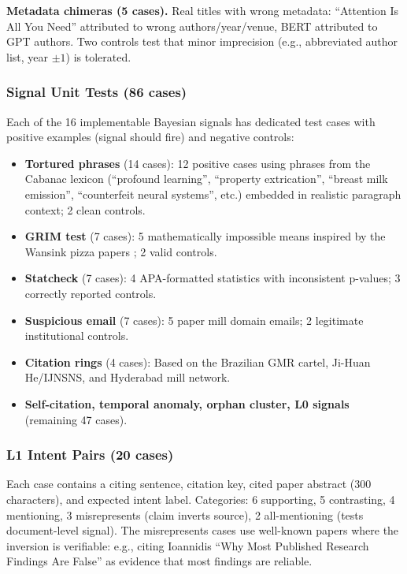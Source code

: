\documentclass[sigconf,nonacm]{acmart}
\begin{document}
\textbf{Metadata chimeras (5 cases).}
Real titles with wrong metadata: ``Attention Is All You Need'' attributed to wrong authors/year/venue, BERT attributed to GPT authors.
Two controls test that minor imprecision (e.g., abbreviated author list, year $\pm 1$) is tolerated.

\subsubsection{Signal Unit Tests (86 cases)}

Each of the 16 implementable Bayesian signals has dedicated test cases with positive examples (signal should fire) and negative controls:

\begin{itemize}[leftmargin=*]
    \item \textbf{Tortured phrases} (14 cases): 12 positive cases using phrases from the Cabanac lexicon (``profound learning'', ``property extrication'', ``breast milk emission'', ``counterfeit neural systems'', etc.) embedded in realistic paragraph context; 2 clean controls.

    \item \textbf{GRIM test} (7 cases): 5 mathematically impossible means inspired by the Wansink pizza papers \cite{vanderzee2017}; 2 valid controls.

    \item \textbf{Statcheck} (7 cases): 4 APA-formatted statistics with inconsistent p-values; 3 correctly reported controls.

    \item \textbf{Suspicious email} (7 cases): 5 paper mill domain emails; 2 legitimate institutional controls.

    \item \textbf{Citation rings} (4 cases): Based on the Brazilian GMR cartel, Ji-Huan He/IJNSNS, and Hyderabad mill network.

    \item \textbf{Self-citation, temporal anomaly, orphan cluster, L0 signals} (remaining 47 cases).
\end{itemize}

\subsubsection{L1 Intent Pairs (20 cases)}

Each case contains a citing sentence, citation key, cited paper abstract (300 characters), and expected intent label.
Categories: 6 supporting, 5 contrasting, 4 mentioning, 3 misrepresents (claim inverts source), 2 all-mentioning (tests document-level signal).
The misrepresents cases use well-known papers where the inversion is verifiable: e.g., citing Ioannidis ``Why Most Published Research Findings Are False'' as evidence that most findings are reliable.
\end{document}
